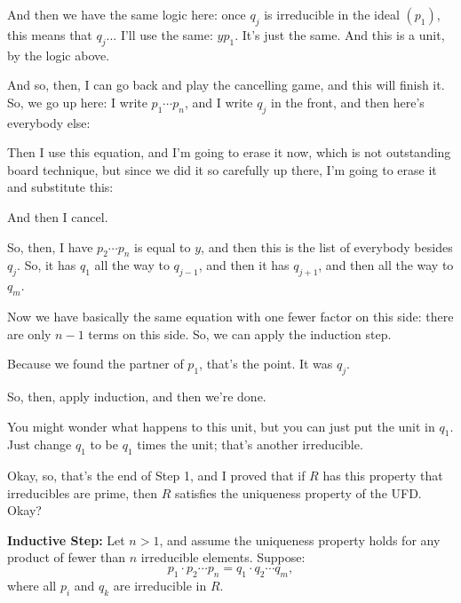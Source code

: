 \begin{proofWrapper}
\begin{speech}[00:43:15 - 00:45:19]
And then we have the same logic here: once $q_j$ is irreducible in the ideal $(p_1)$, this means that $q_j$... I'll use the same: $y p_1$.  It's just the same. And this is a unit,  by the logic above.

And so, then, I can go back and play the cancelling game, and this will finish it. So, we go up here: I write $p_1 \cdots p_n$,  and I write $q_j$ in the front, and then here's everybody else: 

Then I use this equation, and I'm going to erase it now, which is not outstanding board technique, but since we did it so carefully up there, I'm going to erase it and substitute this: 

And then I cancel. 

So, then, I have $p_2 \cdots p_n$ is equal to $y$, and then this is the list of everybody besides $q_j$. So, it has $q_1$ all the way to $q_{j-1}$, and then it has $q_{j+1}$, and then all the way to $q_m$. 

Now we have basically the same equation with one fewer factor on this side: there are only $n - 1$ terms on this side. So, we can apply the induction step.

Because we found the partner of $p_1$, that's the point. It was $q_j$. 

So, then, apply induction, and then we're done. 

You might wonder what happens to this unit, but you can just put the unit in $q_1$. Just change $q_1$ to be $q_1$ times the unit; that's another irreducible.

Okay, so, that's the end of Step 1, and I proved that if $R$ has this property that irreducibles are prime, then $R$ satisfies the uniqueness property of the UFD. Okay?
\end{speech}

\begin{content}
\textbf{Inductive Step:} Let $n > 1$, and assume the uniqueness property holds for any product of fewer than $n$ irreducible elements. Suppose:
\begin{equation}\label{eq:induction-setup}
p_1 \cdot p_2 \cdots p_n = q_1 \cdot q_2 \cdots q_m,
\end{equation}
where all $p_i$ and $q_k$ are irreducible in $R$.


\end{content}
\end{proofWrapper}
